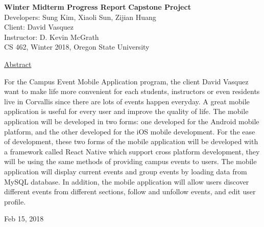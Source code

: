 \documentclass[letterpaper, 10pt,titlepage]{article}
\newcommand\tab[1][1cm]{\hspace*{#1}}
\begin{document}
\begin{titlepage}
\begin{center}
    \Huge
    \textbf{Winter Midterm Progress Report}
    \textbf{Capstone Project}\\
    \vspace{1.0cm}
    \large
    Developers: Sung Kim, Xiaoli Sun, Zijian Huang\\
    Client: David Vasquez\\
    \vspace{1.5cm}
    \large
    Instructor: D. Kevin McGrath\\

    \large
    CS 462, Winter 2018, Oregon State University\\    

    \vspace{3.2cm}

    \large
    \underline{Abstract}\\
    \vspace{0.3cm}
    \end{center}
    \large

    \tab For the Campus Event Mobile Application program, the client David Vasquez want to make life more convenient for each students, instructors or even residents live in Corvallis since there are lots of events happen everyday. A great mobile application is useful for every user and improve the quality of life. The mobile application will be developed in two forms: one developed for the Android mobile platform, and the other developed for the iOS mobile development. For the ease of development, these two forms of the mobile application will be developed with a framework called React Native which support cross platform development, they will be using the same methods of providing campus events to users. The mobile application will display current events and group events by loading data from MySQL database. In addition, the mobile application will allow users discover different events from different sections, follow and unfollow events, and edit user profile. 
    \vspace{0.8cm}
    \vfill
    
\begin{center}    
    Feb 15, 2018

\end{center}
\end{titlepage}


\tableofcontents
\newpage
\end{document}
